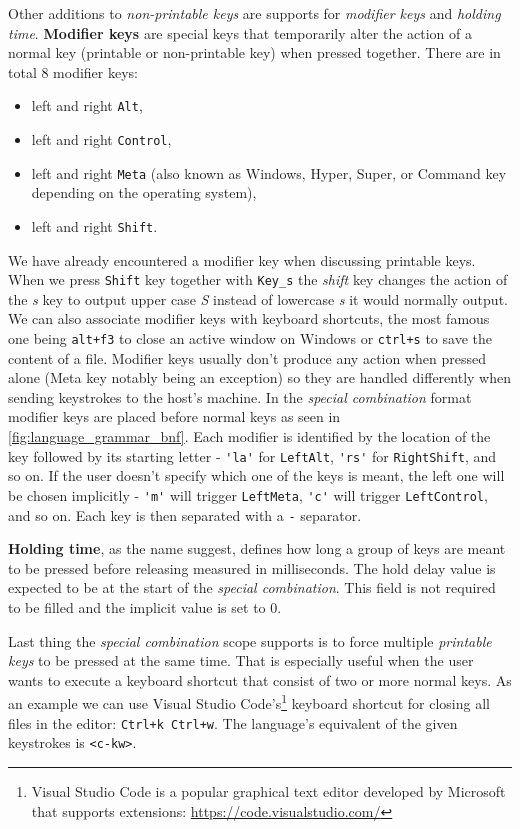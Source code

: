 Other additions to \emph{non-printable keys} are supports for \emph{modifier keys} and \emph{holding time}. \textbf{Modifier keys} are special keys that temporarily alter the action of a normal key (printable or non-printable key) when pressed together. There are in total 8 modifier keys:
\begin{itemize}
    \item left and right \verb|Alt|,
    \item left and right \verb|Control|,
    \item left and right \verb|Meta| (also known as Windows, Hyper, Super, or Command key depending on the operating system),
    \item left and right \verb|Shift|.
\end{itemize}
 We have already encountered a modifier key when discussing printable keys. When we press \verb|Shift| key together with \verb|Key_s| the \emph{shift} key changes the action of the \emph{s} key to output upper case \emph{S} instead of lowercase \emph{s} it would normally output. We can also associate modifier keys with keyboard shortcuts, the most famous one being \verb|alt+f3| to close an active window on Windows or \verb|ctrl+s| to save the content of a file. Modifier keys usually don't produce any action when pressed alone (Meta key notably being an exception) so they are handled differently when sending keystrokes to the host's machine. In the \emph{special combination} format modifier keys are placed before normal keys as seen in \autoref{fig:language_grammar_bnf}. Each modifier is identified by the location of the key followed by its starting letter \-- \verb|'la'| for \verb|LeftAlt|, \verb|'rs'| for \verb|RightShift|, and so on. If the user doesn't specify which one of the keys is meant, the left one will be chosen implicitly \-- \verb|'m'| will trigger \verb|LeftMeta|, \verb|'c'| will trigger \verb|LeftControl|, and so on. Each key is then separated with a \verb|-| separator.

\textbf{Holding time}, as the name suggest, defines how long a group of keys are meant to be pressed before releasing measured in milliseconds. The hold delay value is expected to be at the start of the \emph{special combination}. This field is not required to be filled and the implicit value is set to 0. 

Last thing the \emph{special combination} scope supports is to force multiple \emph{printable keys} to be pressed at the same time. That is especially useful when the user wants to execute a keyboard shortcut that consist of two or more normal keys. As an example we can use Visual Studio Code's\footnote{Visual Studio Code is a popular graphical text editor developed by Microsoft that supports extensions: \url{https://code.visualstudio.com/}} keyboard shortcut for closing all files in the editor: \verb|Ctrl+k Ctrl+w|. The language's equivalent of the given keystrokes is \verb|<c-kw>|. 

